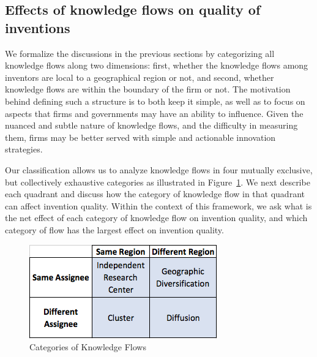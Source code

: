 \documentclass[12pt,letterpaper]{article}
\begin{document}
\subsection*{Effects of knowledge flows on quality of inventions}

We formalize the discussions in the previous sections by categorizing all knowledge flows along two dimensions:  first, whether the knowledge flows among inventors are local to a geographical region or not, and second, whether knowledge flows are within the boundary of the firm or not. The motivation behind defining such a structure is to both keep it simple, as well as to focus on aspects that firms and governments may have an ability to influence. Given the nuanced and subtle nature of knowledge flows, and the difficulty in measuring them, firms may be better served with simple and actionable innovation strategies. \par

Our classification allows us to analyze knowledge flows in four mutually exclusive, but collectively exhaustive categories as illustrated in Figure~\ref{fig:2x2}. We next describe each quadrant and discuss how the category of knowledge flow in that quadrant can affect invention quality. Within the context of this framework, we ask what is the net effect of each category of knowledge flow on invention quality, and which category of flow has the largest effect on invention quality. \par


\begin{figure}[h!]
\begin{centering}
  \captionsetup{labelsep=newline}
  \caption{\newline Categories of Knowledge Flows}
  \label{fig:2x2}
  \includegraphics{2x2}
\end{centering}
\end{figure}
\end{document}
